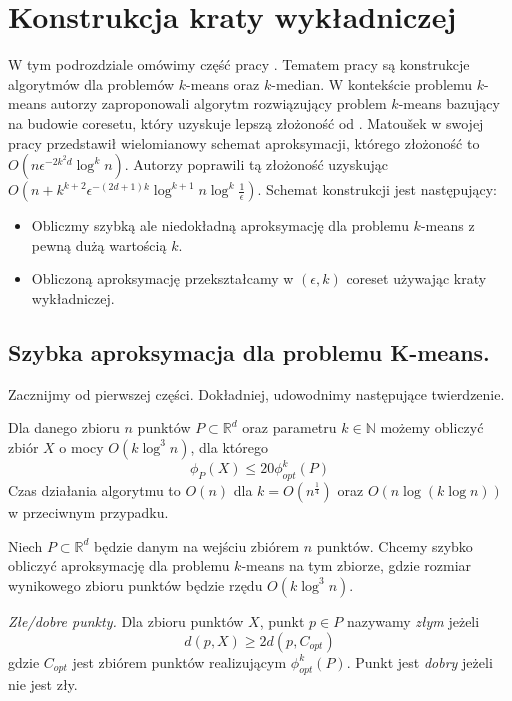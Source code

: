 \section{Konstrukcja kraty wykładniczej}

W tym podrozdziale omówimy część pracy \cite{10.1145/1007352.1007400}.
Tematem pracy są konstrukcje algorytmów dla problemów $k$-means oraz $k$-median.
W kontekście problemu $k$-means autorzy zaproponowali algorytm rozwiązujący problem $k$-means bazujący na budowie coresetu, który uzyskuje lepszą złożoność od \cite{Matousek99onapproximate}.
Matoušek w swojej pracy przedstawił wielomianowy schemat aproksymacji, którego złożoność to $O(n\epsilon^{-2k^2d}\log^kn)$.
Autorzy \cite{10.1145/1007352.1007400} poprawili tą złożoność uzyskując $O(n+k^{k+2}\epsilon^{-(2d+1)k}\log^{k+1}n \log^k\frac{1}{\epsilon})$.
Schemat konstrukcji jest następujący:
\begin{itemize}
    \item Obliczmy szybką ale niedokładną aproksymację dla problemu $k$-means z pewną dużą wartością $k$.
    \item Obliczoną aproksymację przekształcamy w $(\epsilon, k)$ coreset używając kraty wykładniczej.
\end{itemize}


\subsection{Szybka aproksymacja dla problemu K-means.}
\noindent
Zacznijmy od pierwszej części.
Dokładniej, udowodnimy następujące twierdzenie.

\begin{thm}{\cite{10.1145/1007352.1007400}}
    Dla danego zbioru $n$ punktów $P \subset \mathbb{R}^d$ oraz parametru $k \in \mathbb{N}$ możemy 
    obliczyć zbiór $X$ o mocy $O(k \log^{3}n)$, dla którego 
    \begin{equation}
        \phi_{P}(X) \leq 20 \phi_{opt}^{k}(P)
    \end{equation}
    Czas działania algorytmu to $O(n)$ dla $k = O(n^{\frac{1}{4}})$ oraz $O(n \log (k \log n))$ w przeciwnym przypadku.
\end{thm}

\noindent
Niech $P \subset \mathbb{R}^{d}$ będzie danym na wejściu zbiórem $n$ punktów.
Chcemy szybko obliczyć aproksymację dla problemu $k$-means na tym zbiorze, gdzie rozmiar wynikowego zbioru punktów będzie rzędu $O(k \log^{3}n)$.

\begin{definition}
    \emph{Złe/dobre punkty.} Dla zbioru punktów $X$, punkt $p \in P$ nazywamy \textit{złym} jeżeli
    \begin{equation}
        d(p, X) \geq 2d(p, C_{opt})
    \end{equation}
    gdzie $C_{opt}$ jest zbiórem punktów realizującym $\phi_{opt}^{k}(P)$.
    Punkt jest \textit{dobry} jeżeli nie jest zły.
\end{definition}

